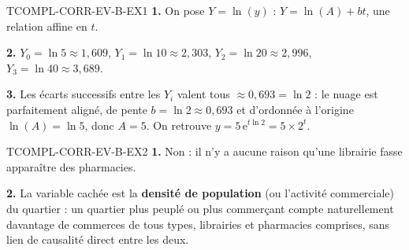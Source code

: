 \begin{corrige}{TCOMPL-CORR-EV-B-EX1}
\textbf{1.} On pose $Y=\ln(y)$ : $Y = \ln(A) + bt$, une relation affine en $t$.

\textbf{2.} $Y_0=\ln5\approx1{,}609$, $Y_1=\ln10\approx2{,}303$, $Y_2=\ln20\approx2{,}996$, $Y_3=\ln40\approx3{,}689$.

\textbf{3.} Les écarts successifs entre les $Y_i$ valent tous $\approx0{,}693=\ln2$ : le nuage est parfaitement aligné, de pente $b=\ln2\approx0{,}693$ et d'ordonnée à l'origine $\ln(A)=\ln5$, donc $A=5$. On retrouve $y=5\,\mathrm{e}^{t\ln2}=5\times2^t$.
\end{corrige}

\begin{corrige}{TCOMPL-CORR-EV-B-EX2}
\textbf{1.} Non : il n'y a aucune raison qu'une librairie \og fasse apparaître \fg{} des pharmacies.

\textbf{2.} La variable cachée est la \textbf{densité de population} (ou l'activité commerciale) du quartier : un quartier plus peuplé ou plus commerçant compte naturellement davantage de commerces de tous types, librairies et pharmacies comprises, sans lien de causalité direct entre les deux.
\end{corrige}

